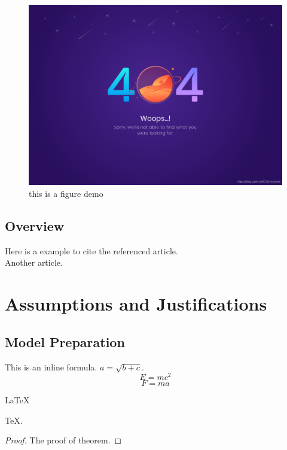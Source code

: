 \documentclass[12pt]{mcmthesis}
\begin{document}
\begin{figure}[ht]   %
  \centering
  \includegraphics[scale=0.2]{404.png}
  \caption{this is a figure demo}
  \label{fig:label}
\end{figure}





\subsection{Overview}
Here is a example to cite the referenced article\cite{konishi:1999ab}. \\
Another article\cite{refName}.
\section{Assumptions and Justifications}
\subsection{Model Preparation}
This is an inline formula. $a = \sqrt{b + c}$.
\begin{equation}
  E = mc^2
\end{equation}
\begin{equation}
  F = ma
\end{equation}
\begin{Theorem} \label{thm:latex}
  \LaTeX
\end{Theorem}
\begin{Lemma} \label{thm:tex}
  \TeX .
\end{Lemma}
\begin{proof}
  The proof of theorem.
\end{proof}
\end{document}
